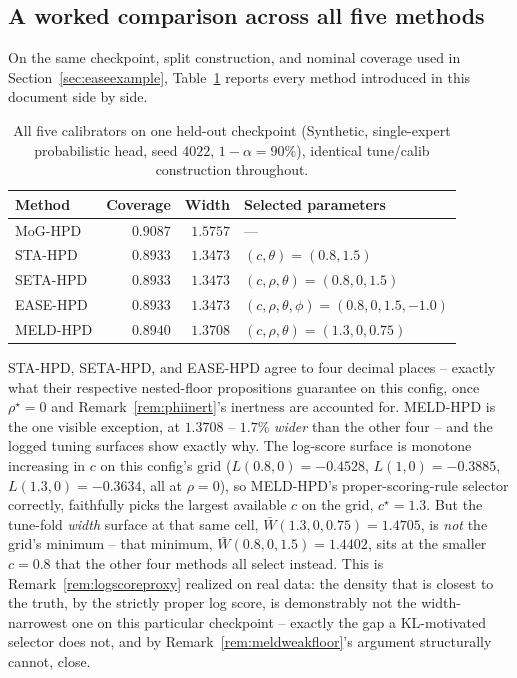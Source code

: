 \documentclass[11pt]{article}
\begin{document}
\subsection{A worked comparison across all five methods}
\label{sec:meldexample}

On the same checkpoint, split construction, and nominal coverage used in
Section~\ref{sec:easeexample}, Table~\ref{tab:allfive} reports every method introduced in this
document side by side.

\begin{table}[h]
\centering
\caption{All five calibrators on one held-out checkpoint (Synthetic, single-expert probabilistic
head, seed $4022$, $1-\alpha=90\%$), identical tune/calib construction throughout.}
\label{tab:allfive}
\begin{tabular}{@{}lrrl@{}}
\toprule
\textbf{Method} & \textbf{Coverage} & \textbf{Width} & \textbf{Selected parameters} \\
\midrule
MoG-HPD & $0.9087$ & $1.5757$ & --- \\
STA-HPD & $0.8933$ & $1.3473$ & $(c,\theta)=(0.8,1.5)$ \\
SETA-HPD & $0.8933$ & $1.3473$ & $(c,\rho,\theta)=(0.8,0,1.5)$ \\
EASE-HPD & $0.8933$ & $1.3473$ & $(c,\rho,\theta,\phi)=(0.8,0,1.5,-1.0)$ \\
MELD-HPD & $0.8940$ & $1.3708$ & $(c,\rho,\theta)=(1.3,0,0.75)$ \\
\bottomrule
\end{tabular}
\end{table}

STA-HPD, SETA-HPD, and EASE-HPD agree to four decimal places -- exactly what their respective
nested-floor propositions guarantee on this config, once $\rho^\star=0$ and
Remark~\ref{rem:phiinert}'s inertness are accounted for. MELD-HPD is the one visible exception, at
$1.3708$ -- $1.7\%$ \emph{wider} than the other four -- and the logged tuning surfaces show exactly
why. The log-score surface is monotone increasing in $c$ on this config's grid ($L(0.8,0)=-0.4528$,
$L(1,0)=-0.3885$, $L(1.3,0)=-0.3634$, all at $\rho=0$), so MELD-HPD's proper-scoring-rule selector
correctly, faithfully picks the largest available $c$ on the grid, $c^\star=1.3$. But the tune-fold
\emph{width} surface at that same cell, $\bar W(1.3,0,0.75)=1.4705$, is \emph{not} the grid's
minimum -- that minimum, $\bar W(0.8,0,1.5)=1.4402$, sits at the smaller $c=0.8$ that the other four
methods all select instead. This is Remark~\ref{rem:logscoreproxy} realized on real data: the
density that is closest to the truth, by the strictly proper log score, is demonstrably not the
width-narrowest one on this particular checkpoint -- exactly the gap a KL-motivated selector does
not, and by Remark~\ref{rem:meldweakfloor}'s argument structurally cannot, close.
\end{document}
